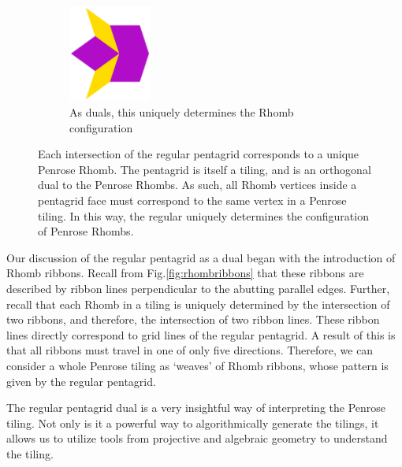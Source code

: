 \documentclass[
  oneside,
  11pt, a4paper,
  footinclude=true,
  headinclude=true,
  cleardoublepage=empty
]{scrbook}
\begin{document}
\begin{figure}[H]
\begin{subfigure}[b]{\textwidth}
\centering
\includegraphics[width=0.3\textwidth]{RhombConstructed}
\caption{As duals, this uniquely determines the Rhomb configuration}
\end{subfigure}
\caption[Construction of Penrose Tiling from Pentagrids]{Each intersection of the regular pentagrid corresponds to a unique Penrose Rhomb. The pentagrid is itself a tiling, and is an orthogonal dual to the Penrose Rhombs. As such, all Rhomb vertices inside a pentagrid face must correspond to the same vertex in a Penrose tiling. In this way, the regular uniquely determines the configuration of Penrose Rhombs.}
\label{fig:pentagridconstruction}
\end{figure}

Our discussion of the regular pentagrid as a dual began with the introduction of Rhomb ribbons. Recall from Fig.\ref{fig:rhombribbons} that these ribbons are described by ribbon lines perpendicular to the abutting parallel edges. Further, recall that each Rhomb in a tiling is uniquely determined by the intersection of two ribbons, and therefore, the intersection of two ribbon lines. These ribbon lines directly correspond to grid lines of the regular pentagrid. A result of this is that all ribbons must travel in one of only five directions. Therefore, we can consider a whole Penrose tiling as `weaves' of Rhomb ribbons, whose pattern is given by the regular pentagrid. 

The regular pentagrid dual is a very insightful way of interpreting the Penrose tiling. Not only is it a powerful way to algorithmically generate the tilings, it allows us to utilize tools from projective and algebraic geometry to understand the tiling.
\end{document}
